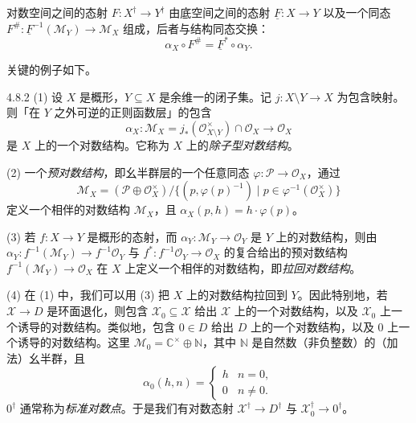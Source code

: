 对数空间之间的态射 $F:X^\dagger\to Y^\dagger$ 由底空间之间的态射 $\underline{F}:X\to Y$ 以及一个同态 $F^\#:\underline{F}^{-1}(\mathcal{M}_Y)\to\mathcal{M}_X$ 组成，后者与结构同态交换：
\[
\alpha_X\circ F^\#=\underline{F}^*\circ\alpha_Y.
\]

关键的例子如下。

\begin{example}{4.8.2}
(1) 设 $X$ 是概形，$Y\subseteq X$ 是余维一的闭子集。记 $j:X\setminus Y\to X$ 为包含映射。则「在 $Y$ 之外可逆的正则函数层」的包含
\[
\alpha_X:\mathcal{M}_X=j_*(\mathcal{O}_{X\setminus Y}^\times)\cap\mathcal{O}_X\to\mathcal{O}_X
\]
是 $X$ 上的一个对数结构。它称为 $X$ 上的\emph{除子型对数结构}。

(2) 一个\emph{预对数结构}，即幺半群层的一个任意同态 $\varphi:\mathcal{P}\to\mathcal{O}_X$，通过
\[
\mathcal{M}_X=(\mathcal{P}\oplus\mathcal{O}_X^\times)/\{(p,\varphi(p)^{-1})\mid p\in\varphi^{-1}(\mathcal{O}_X^\times)\}
\]
定义一个相伴的对数结构 $\mathcal{M}_X$，且 $\alpha_X(p,h)=h\cdot\varphi(p)$。

(3) 若 $f:X\to Y$ 是概形的态射，而 $\alpha_Y:\mathcal{M}_Y\to\mathcal{O}_Y$ 是 $Y$ 上的对数结构，则由 $\alpha_Y:f^{-1}(\mathcal{M}_Y)\to f^{-1}\mathcal{O}_Y$ 与 $f^*:f^{-1}\mathcal{O}_Y\to\mathcal{O}_X$ 的复合给出的预对数结构 $f^{-1}(\mathcal{M}_Y)\to\mathcal{O}_X$ 在 $X$ 上定义一个相伴的对数结构，即\emph{拉回对数结构}。

(4) 在 (1) 中，我们可以用 (3) 把 $X$ 上的对数结构拉回到 $Y$。因此特别地，若 $\mathcal{X}\to D$ 是环面退化，则包含 $\mathcal{X}_0\subseteq\mathcal{X}$ 给出 $\mathcal{X}$ 上的一个对数结构，以及 $\mathcal{X}_0$ 上一个诱导的对数结构。类似地，包含 $0\in D$ 给出 $D$ 上的一个对数结构，以及 $0$ 上一个诱导的对数结构。这里 $\mathcal{M}_0=\mathbb{C}^\times\oplus\mathbb{N}$，其中 $\mathbb{N}$ 是自然数（非负整数）的（加法）幺半群，且
\[
\alpha_0(h,n)=\begin{cases} h & n=0,\\ 0 & n\neq 0.\end{cases}
\]
$0^\dagger$ 通常称为\emph{标准对数点}。于是我们有对数态射 $\mathcal{X}^\dagger\to D^\dagger$ 与 $\mathcal{X}_0^\dagger\to 0^\dagger$。


\end{example}
